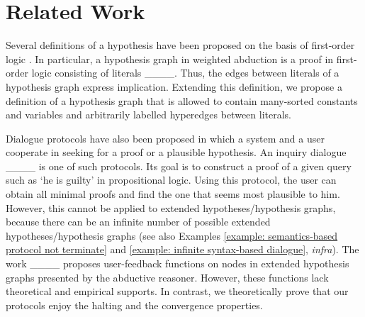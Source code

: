 \section{Related Work}
Several definitions of a hypothesis have been proposed on the basis of first-order logic \cite[Section 2.2]{paul1993approaches}.
In particular, a hypothesis graph in weighted abduction is a proof in first-order logic consisting of literals ____.
Thus, the edges between literals of a hypothesis graph express implication.
Extending this definition, we propose a definition of a hypothesis graph that is allowed to contain many-sorted constants and variables and arbitrarily labelled hyperedges between literals.

Dialogue protocols have also been proposed in which a system and a user cooperate in seeking for a proof or a plausible hypothesis.
An inquiry dialogue ____ is one of such protocols. Its goal is to construct a proof of a given query such as `he is guilty' in propositional logic.
Using this protocol, the user can obtain all minimal proofs and find the one that seems most plausible to him.
However, this cannot be applied to extended hypotheses/hypothesis graphs, because there can be an infinite number of possible extended hypotheses/hypothesis graphs (see also Examples \ref{example: semantics-based protocol not terminate} and \ref{example: infinite syntax-based dialogue}, \textit{infra}).
The work ____ proposes user-feedback functions on nodes in extended hypothesis graphs presented by the abductive reasoner.
However, these functions lack theoretical and empirical supports. 
In contrast, we theoretically prove that our protocols enjoy the halting and the convergence properties.